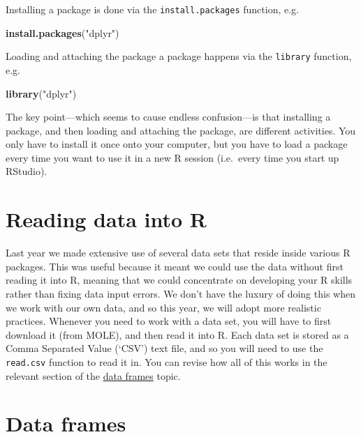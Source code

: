 \documentclass[]{book}
\newenvironment{Shaded}{\begin{snugshade}}{\end{snugshade}}
\newcommand{\KeywordTok}[1]{\textcolor[rgb]{0.13,0.29,0.53}{\textbf{{#1}}}}
\newcommand{\StringTok}[1]{\textcolor[rgb]{0.31,0.60,0.02}{{#1}}}
\newcommand{\NormalTok}[1]{{#1}}
\begin{document}
Installing a package is done via the \texttt{install.packages} function,
e.g.

\begin{Shaded}
\begin{Highlighting}[]
\KeywordTok{install.packages}\NormalTok{(}\StringTok{"dplyr"}\NormalTok{)}
\end{Highlighting}
\end{Shaded}

Loading and attaching the package a package happens via the
\texttt{library} function, e.g.

\begin{Shaded}
\begin{Highlighting}[]
\KeywordTok{library}\NormalTok{(}\StringTok{"dplyr"}\NormalTok{)}
\end{Highlighting}
\end{Shaded}

The key point---which seems to cause endless confusion---is that
installing a package, and then loading and attaching the package, are
different activities. You only have to install it once onto your
computer, but you have to load a package every time you want to use it
in a new R session (i.e.~every time you start up RStudio).

\section{Reading data into R}\label{reading-data-into-r}

Last year we made extensive use of several data sets that reside inside
various R packages. This was useful because it meant we could use the
data without first reading it into R, meaning that we could concentrate
on developing your R skills rather than fixing data input errors. We
don't have the luxury of doing this when we work with our own data, and
so this year, we will adopt more realistic practices. Whenever you need
to work with a data set, you will have to first download it (from MOLE),
and then read it into R. Each data set is stored as a Comma Separated
Value (`CSV') text file, and so you will need to use the
\texttt{read.csv} function to read it in. You can revise how all of this
works in the relevant section of the
\href{\%7B\%7Bsite.baseurl-L1\%7D\%7D/data-frames.html\#access-data}{data
frames} topic.

\section{Data frames}\label{data-frames}
\end{document}
